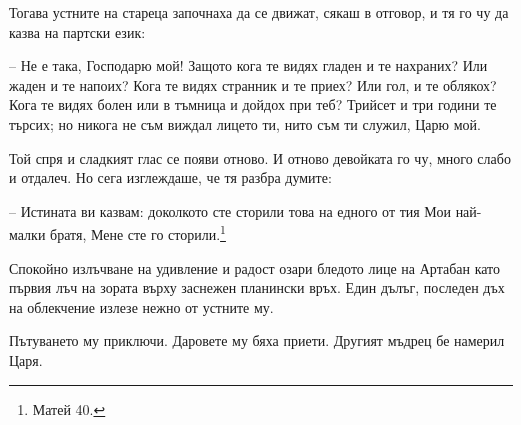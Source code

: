 Тогава устните на стареца започнаха да се движат, сякаш в отговор, и тя го чу да
казва на партски език:

-- Не е така, Господарю мой! Защото кога те видях гладен и те нахраних? Или
жаден и те напоих? Кога те видях странник и те приех? Или гол, и те облякох?
Кога те видях болен или в тъмница и дойдох при теб? Трийсет и три години те
търсих; но никога не съм виждал лицето ти, нито съм ти служил, Царю мой.

Той спря и сладкият глас се появи отново. И отново девойката го чу, много слабо
и отдалеч. Но сега изглеждаше, че тя разбра думите:

-- Истината ви казвам: доколкото сте сторили това на едного от тия Мои най-малки
братя, Мене сте го сторили.\footnote{Матей 40.}

Спокойно излъчване на удивление и радост озари бледото лице на Артабан като
първия лъч на зората върху заснежен планински връх. Един дълъг, последен дъх на
облекчение излезе нежно от устните му.

Пътуването му приключи. Даровете му бяха приети. Другият мъдрец бе намерил Царя.
